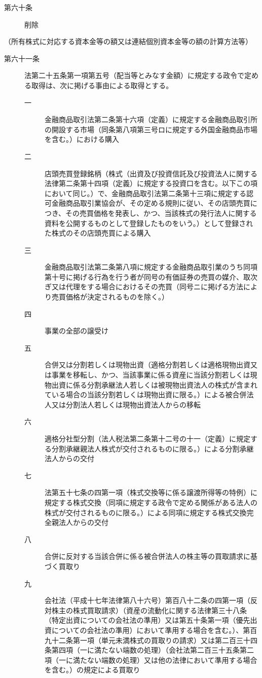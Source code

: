 \documentclass[twocolumn,a4j,10pt]{ltjtarticle}
\begin{document}
\begin{description}
\item[第六十条]削除
\end{description}
\noindent\hspace{10pt}（所有株式に対応する資本金等の額又は連結個別資本金等の額の計算方法等）
\begin{description}
\item[第六十一条]法第二十五条第一項第五号（配当等とみなす金額）に規定する政令で定める取得は、次に掲げる事由による取得とする。
\begin{description}
\item[一]金融商品取引法第二条第十六項（定義）に規定する金融商品取引所の開設する市場（同条第八項第三号ロに規定する外国金融商品市場を含む。）における購入
\item[二]店頭売買登録銘柄（株式（出資及び投資信託及び投資法人に関する法律第二条第十四項（定義）に規定する投資口を含む。以下この項において同じ。）で、金融商品取引法第二条第十三項に規定する認可金融商品取引業協会が、その定める規則に従い、その店頭売買につき、その売買価格を発表し、かつ、当該株式の発行法人に関する資料を公開するものとして登録したものをいう。）として登録された株式のその店頭売買による購入
\item[三]金融商品取引法第二条第八項に規定する金融商品取引業のうち同項第十号に掲げる行為を行う者が同号の有価証券の売買の媒介、取次ぎ又は代理をする場合におけるその売買（同号ニに掲げる方法により売買価格が決定されるものを除く。）
\item[四]事業の全部の譲受け
\item[五]合併又は分割若しくは現物出資（適格分割若しくは適格現物出資又は事業を移転し、かつ、当該事業に係る資産に当該分割若しくは現物出資に係る分割承継法人若しくは被現物出資法人の株式が含まれている場合の当該分割若しくは現物出資に限る。）による被合併法人又は分割法人若しくは現物出資法人からの移転
\item[六]適格分社型分割（法人税法第二条第十二号の十一（定義）に規定する分割承継親法人株式が交付されるものに限る。）による分割承継法人からの交付
\item[七]法第五十七条の四第一項（株式交換等に係る譲渡所得等の特例）に規定する株式交換（同項に規定する政令で定める関係がある法人の株式が交付されるものに限る。）による同項に規定する株式交換完全親法人からの交付
\item[八]合併に反対する当該合併に係る被合併法人の株主等の買取請求に基づく買取り
\item[九]会社法（平成十七年法律第八十六号）第百八十二条の四第一項（反対株主の株式買取請求）（資産の流動化に関する法律第三十八条（特定出資についての会社法の準用）又は第五十条第一項（優先出資についての会社法の準用）において準用する場合を含む。）、第百九十二条第一項（単元未満株式の買取りの請求）又は第二百三十四条第四項（一に満たない端数の処理）（会社法第二百三十五条第二項（一に満たない端数の処理）又は他の法律において準用する場合を含む。）の規定による買取り

\end{description}
\end{description}
\end{document}
